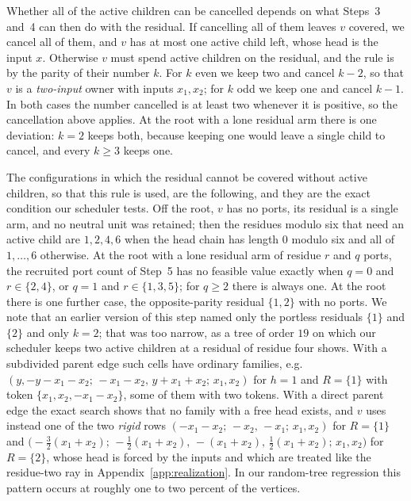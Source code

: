 \documentclass[11pt,a4paper]{article}
\theoremstyle{plain}
\theoremstyle{definition}
\theoremstyle{remark}
\begin{document}
Whether all of the active children can be cancelled depends on what Steps~3
and~4 can then do with the residual.  If cancelling all of them leaves $v$
covered, we cancel all of them, and $v$ has at most one active child left,
whose head is the input $x$.  Otherwise $v$ must spend active children on the
residual, and the rule is by the parity of their number $k$.  For $k$ even we
keep two and cancel $k-2$, so that $v$ is a \emph{two-input} owner with inputs
$x_1,x_2$; for $k$ odd we keep one and cancel $k-1$.  In both cases the number
cancelled is at least two whenever it is positive, so the cancellation above
applies.  At the root with a lone residual arm there is one deviation: $k=2$
keeps both, because keeping one would leave a single child to cancel, and every
$k\ge 3$ keeps one.

The configurations in which the residual cannot be covered without active
children, so that this rule is used, are the following, and they are the exact
condition our scheduler tests.  Off the root, $v$ has no ports, its residual is
a single arm, and no neutral unit was retained; then the residues modulo six
that need an active child are $1,2,4,6$ when the head chain has length $0$
modulo six and all of $1,\dots,6$ otherwise.  At the root with a lone residual
arm of residue $r$ and $q$ ports, the recruited port count of Step~5 has no
feasible value exactly when $q=0$ and $r\in\{2,4\}$, or $q=1$ and
$r\in\{1,3,5\}$; for $q\ge2$ there is always one.  At the root there is one
further case, the opposite-parity residual $\{1,2\}$ with no ports.  We note
that an earlier version of this step named only the portless residuals $\{1\}$
and $\{2\}$ and only $k=2$; that was too narrow, as a tree of order $19$ on
which our scheduler keeps two active children at a residual of residue four
shows.  With a subdivided parent
edge such cells have ordinary families, e.g.\
$(y,-y-x_1-x_2;\,-x_1-x_2,\,y+x_1+x_2;\,x_1,x_2)$ for $h=1$ and $R=\{1\}$ with
token $\{x_1,x_2,-x_1-x_2\}$, some of them with two tokens.  With a direct
parent edge the exact search shows that no family with a free head exists,
and $v$ uses instead one of the two \emph{rigid} rows
$(-x_1-x_2;\,-x_2,\,-x_1;\,x_1,x_2)$ for $R=\{1\}$ and
$\bigl(-\tfrac32(x_1+x_2);\,-\tfrac12(x_1+x_2),\,-(x_1+x_2),\,\tfrac12(x_1+x_2);\,x_1,x_2\bigr)$
for $R=\{2\}$, whose head is forced by the inputs and which are treated like
the residue-two ray in Appendix~\ref{app:realization}.  In our random-tree
regression this pattern occurs at roughly one to two percent of the vertices.
\end{document}
